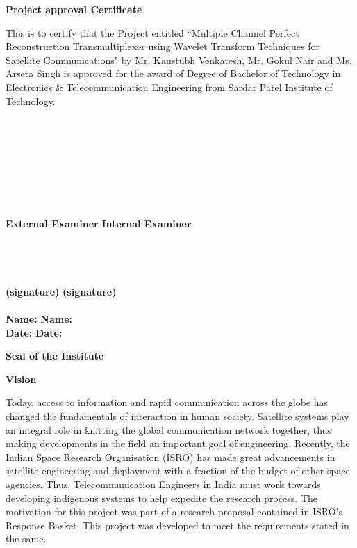 \newpage
\thispagestyle{empty}
\vspace*{0.2cm}
\vspace{1cm}
\begin{center}
 \large\textbf{Project approval Certificate}
\end{center}
\vspace{2cm}
This is to certify that the Project entitled ``Multiple Channel Perfect Reconstruction Transmultiplexer using Wavelet Transform Techniques for Satellite Communications" by Mr. Kaustubh Venkatesh, Mr. Gokul Nair and Ms. Arseta Singh is approved  for the award of Degree of Bachelor of Technology in Electronics \& Telecommunication Engineering from Sardar Patel Institute of Technology.\\
\\
\\
\\
\\
\\
\\
\\
\\
\textbf {External Examiner} \hspace{2.85in} \textbf{Internal Examiner}\\ 
\\
\\
\\
\\
\textbf {(signature)} \hspace{3.5in} \textbf{(signature)} \\
\\
\vspace{1cm}
\textbf {Name:} \hspace{3.8in} \textbf{Name:}\\ 
\vspace{2cm}
\textbf {Date:} \hspace{3.9in} \textbf{Date:}\\ 
\vspace{2cm}
\begin{center}
\textbf{Seal of the Institute}\\
\end{center}

\newpage
\thispagestyle{empty} 
\begin{center}
 \large\textbf{Vision}
\end{center}
Today, access to information and rapid communication across the globe has changed the fundamentals of interaction in human society. Satellite systems play an integral role in knitting the global communication network together, thus making developments in the field an important goal of engineering. Recently, the Indian Space Research Organisation (ISRO) has made great advancements in satellite engineering and deployment with a fraction of the budget of other space agencies. Thus, Telecommunication Engineers in India must work towards developing indigenous systems to help expedite the research process. The motivation for this project was part of a research proposal contained in ISRO's Response Basket. This project was developed to meet the requirements stated in the same.

